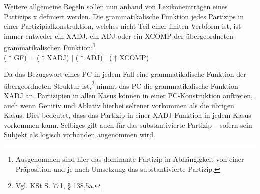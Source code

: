 \documentclass[12pt,a4paper]{article}
\begin{document}


Weitere allgemeine Regeln sollen nun anhand von Lexikoneinträgen eines Partizips x definiert werden.
Die grammatikalische Funktion jedes Partizips in einer Partizipialkonstruktion, welches nicht Teil einer finiten Verbform ist, ist immer entweder ein XADJ, ein ADJ oder ein XCOMP der übergeordneten grammatikalischen Funktion:\footnote{Ausgenommen sind hier das dominante Partizip in Abhängigkeit von einer Präposition und je nach Umsetzung das substantivierte Partizip.} \\
($\uparrow$GF) = ($\uparrow$XADJ) $\mid$ ($\uparrow$ADJ) $\mid$ ($\uparrow$XCOMP)

Da das Bezugswort eines PC in jedem Fall eine grammatikalische Funktion der übergeordneten Struktur ist,\footnote{Vgl. KSt S. 771, § 138,5a.} nimmt das PC die grammatikalische Funktion XADJ an. Partizipien in allen Kasus können in einer PC-Konstruktion auftreten, auch wenn Genitiv und Ablativ hierbei seltener vorkommen als die übrigen Kasus. Dies bedeutet, dass das Partizip in einer XADJ-Funktion in jedem Kasus vorkommen kann. Selbiges gilt auch für das substantivierte Partizip -- sofern sein Subjekt als logisch vorhanden angenommen wird.
\end{document}
